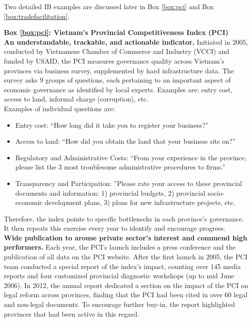 \documentclass[12pt]{article}
\begin{document}
Two detailed IB examples are discussed later in Box \ref{box:pci} and Box \ref{box:tradefacilitation}.

\begin{textbox}
    \textbf{Box \ref{box:pci}: Vietnam's Provincial Competitiveness Index (PCI)}\\

    \textbf{An understandable, trackable, and actionable indicator.} Initiated in 2005, conducted by Vietnamese Chamber of Commerce and Industry (VCCI) and funded by USAID, the PCI measures governance quality across Vietnam's provinces via business survey, supplemented by hard infrastructure data. The survey asks 9 groups of questions, each pertaining to an important aspect of economic governance as identified by local experts. Examples are: entry cost, access to land, informal charge (corruption), etc.\\

    Examples of individual questions are:
    \begin{itemize}[noitemsep]
       \item{Entry cost: ``How long did it take you to register your business?''}
       \item{Access to land: ``How did you obtain the land that your business sits on?''}
       \item{Regulatory and Administrative Costs: ``From your experience in the province, please list the 3 most troublesome administrative procedures to firms.''}
       \item{Transparency and Participation: ''Please rate your access to these provincial documents and information: 1) provincial budgets, 2) provincial socio-economic development plans, 3) plans for new infrastructure projects, etc.}
    \end{itemize}
    Therefore, the index points to specific bottlenecks in each province's governance. It then repeats this exercise every year to identify and encourage progress.\\

    \textbf{Wide publication to arouse private sector's interest and commend high performers.} Each year, the PCI's launch includes a press conference and the publication of all data on the PCI website. After the first launch in 2005, the PCI team conducted a special report of the index's impact, counting over 145 media reports and four customized provincial diagnostic workshops (up to mid June 2006). In 2012, the annual report dedicated a section on the impact of the PCI on legal reform across provinces, finding that the PCI had been cited in over 60 legal and non-legal documents. To encourage further buy-in, the report highlighted provinces that had been active in this regard.\\


\end{textbox}
\end{document}
